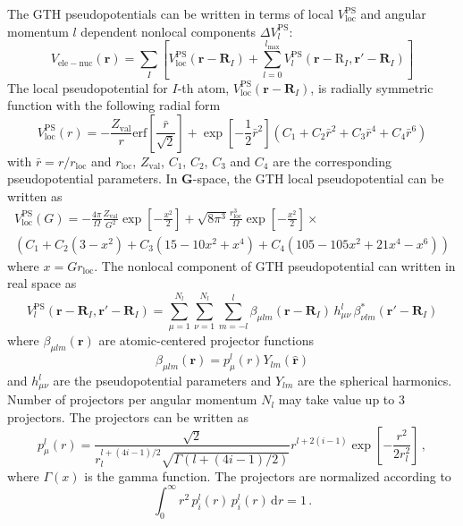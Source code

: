 The GTH pseudopotentials can be written in terms of
local $V^{\mathrm{PS}}_{\mathrm{loc}}$ and
angular momentum $l$ dependent
nonlocal components $\Delta V^{\mathrm{PS}}_{l}$:
\begin{equation}
V_{\mathrm{ele-nuc}}(\mathbf{r}) =
\sum_{I} \left[
V^{\mathrm{PS}}_{\mathrm{loc}}(\mathbf{r}-\mathbf{R}_{I}) +
\sum_{l=0}^{l_{\mathrm{max}}}
V^{\mathrm{PS}}_{l}(\mathbf{r}-\mathrm{R}_{I},\mathbf{r}'-\mathbf{R}_{I})
\right]
\end{equation}
%
The local pseudopotential for
$I$-th atom, $V^{\mathrm{PS}}_{\mathrm{loc}}(\mathbf{r}-\mathbf{R}_{I})$,
is radially symmetric
function with the following radial form
\begin{equation}
V^{\mathrm{PS}}_{\mathrm{loc}}(r) =
-\frac{Z_{\mathrm{val}}}{r}\mathrm{erf}\left[
\frac{\bar{r}}{\sqrt{2}} \right] +
\exp\left[-\frac{1}{2}\bar{r}^2\right]\left(
C_{1} + C_{2}\bar{r}^2 + C_{3}\bar{r}^4 + C_{4}\bar{r}^6
\right)
\label{eq:V_ps_loc_R}
\end{equation}
%
with $\bar{r}=r/r_{\mathrm{loc}}$ and $r_{\mathrm{loc}}$, $Z_{\mathrm{val}}$,
$C_{1}$, $C_{2}$, $C_{3}$ and $C_{4}$ are the corresponding pseudopotential
parameters.
%
In $\mathbf{G}$-space, the GTH local pseudopotential can be written as
\begin{multline}
V^{\mathrm{PS}}_{\mathrm{loc}}(G) = -\frac{4\pi}{\Omega}\frac{Z_{\mathrm{val}}}{G^2}
\exp\left[-\frac{x^2}{2}\right] +
\sqrt{8\pi^3} \frac{r^{3}_{\mathrm{loc}}}{\Omega}\exp\left[-\frac{x^2}{2}\right]\times\\
\left( C_{1} + C_{2}(3 - x^2) + C_{3}(15 - 10x^2 + x^4) + C_{4}(105 - 105x^2 + 21x^4 - x^6) \right)
\label{eq:V_ps_loc_G}
\end{multline}
where $x=G r_{\mathrm{loc}}$.
%
The nonlocal component of GTH pseudopotential can written in real space as
\begin{equation}
V^{\mathrm{PS}}_{l}(\mathbf{r}-\mathbf{R}_{I},\mathbf{r}'-\mathbf{R}_{I}) =
\sum_{\mu=1}^{N_{l}} \sum_{\nu=1}^{N_{l}} \sum_{m=-l}^{l}
\beta_{\mu lm}(\mathbf{r}-\mathbf{R}_{I})\,
h^{l}_{\mu\nu}\,
\beta^{*}_{\nu lm}(\mathbf{r}'-\mathbf{R}_{I})
\end{equation}
where $\beta_{\mu lm}(\mathbf{r})$ are atomic-centered projector functions
\begin{equation}
\beta_{\mu lm}(\mathbf{r}) = 
p^{l}_{\mu}(r) Y_{lm}(\hat{\mathbf{r}})
\label{eq:betaNL_R}
\end{equation}
%
and $h^{l}_{\mu\nu}$ are the pseudopotential parameters and
$Y_{lm}$ are the spherical harmonics. Number of projectors per angular
momentum $N_{l}$ may take value up to 3 projectors.
The projectors can be written as
\begin{equation}
p^{l}_{\mu}(r) = \frac{\sqrt{2}}
{r^{l+(4i-1)/2}_{l}\sqrt{\Gamma(l + (4i-1)/2)}} r^{l+2(i-1)}
\exp\left[-\dfrac{r^2}{2r^{2}_{l}}\right] \, ,
\label{eq:proj_NL_R}
\end{equation}
where $\Gamma(x)$ is the gamma function. The projectors are normalized according
to
\begin{equation}
\int_{0}^{\infty} r^2\,p^{l}_{i}(r)\,p^{l}_{i}(r)\,\mathrm{d}r = 1 \, .
\end{equation}

